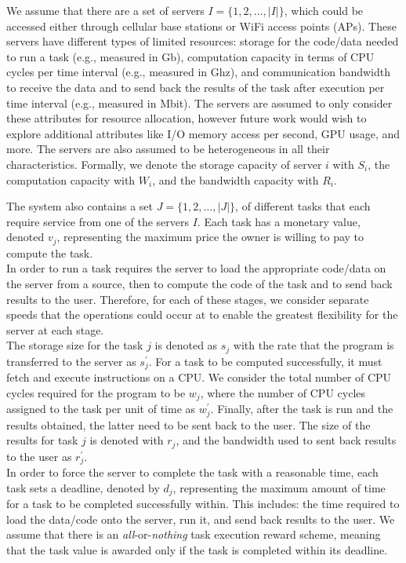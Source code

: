 We assume that there are a set of servers $I = \{1,2,\ldots,\left|I\right|\}$, which could be accessed either through
cellular base stations or WiFi access points (APs). These servers have different types of limited resources:
storage for the code/data needed to run a task (e.g., measured in Gb), computation capacity in terms of CPU cycles per
time interval (e.g., measured in Ghz), and communication bandwidth to receive the data and to send back the results
of the task after execution per time interval (e.g., measured in Mbit). The servers are assumed to only consider these
attributes for resource allocation, however future work would wish to explore additional attributes like I/O memory
access per second, GPU usage, and more. The servers are also assumed to be heterogeneous in all their characteristics.
Formally, we denote the storage capacity of server $i$ with $S_i$, the computation capacity with $W_i$, and the
bandwidth capacity with $R_i$.

The system also contains a set $J = \{1,2,\ldots,\left| J \right|\}$, of different tasks that each require service from one
of the servers $I$. Each task has a monetary value, denoted $v_j$,
representing the maximum price the owner is willing to pay to compute the task. \\
In order to run a task requires the server to load the appropriate code/data on the server from a source, then to
compute the code of the task and to send back results to the user. Therefore, for each of these stages, we consider
separate speeds that the operations could occur at to enable the greatest flexibility for the server at each stage. \\
The storage size for the task $j$ is denoted as $s_j$ with the rate that the program is transferred to the server
as $s^{'}_j$. For a task to be computed successfully, it must fetch and execute instructions on a CPU. We consider the
total number of CPU cycles required for the program to be $w_j$, where the number of CPU cycles assigned to the task
per unit of time as $w^{'}_j$. Finally, after the task is run and the results obtained, the latter need to be sent back
to the user. The size of the results for task $j$ is denoted with $r_j$, and the bandwidth used to sent back results to
the user as $r^{'}_j$. \\
In order to force the server to complete the task with a reasonable time, each task sets a deadline, denoted by $d_j$,
representing the maximum amount of time for a task to be completed successfully within. This includes: the time
required to load the data/code onto the server, run it, and send back results to the user. We assume that there
is an \emph{all}-or-\emph{nothing} task execution reward scheme, meaning that the task value is awarded only if the
task is completed within its deadline.

